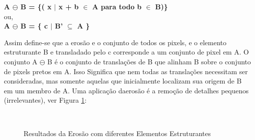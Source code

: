 \documentclass[letterpaper, 10 pt, conference]{ieeeconf}  %
\begin{document}
\begin{center}

\textbf {A $\ominus$ B = \{( x $\mid$ x + b $\in$ A para todo b $\in$ B)\}}\\

ou,\\

\textbf { A $\ominus$  B = \{ c $\mid$  B’ $\subseteq $ A \} }

\end{center}

Assim define-se que a erosão e o conjunto de todos os pixels, e o elemento
estruturante B e transladado pelo c corresponde a um conjunto de pixel em A. O
conjunto A $\ominus$ B é o conjunto de translações de B que alinham B sobre o
conjunto de pixels pretos em A. Isso Significa que nem todas as translações
necessitam ser consideradas, mas somente aquelas que inicialmente localizam sua
origem de B em um membro de A. Uma aplicação daerosão é a remoção de detalhes
pequenos (irrelevantes),  ver Figura \ref{fig:Figura02}:

\begin{figure}[H] \centering

\\


\caption{Resultados da Erosão com diferentes Elementos Estruturantes}
\label{fig:Figura02}
\end{figure}
\end{document}
